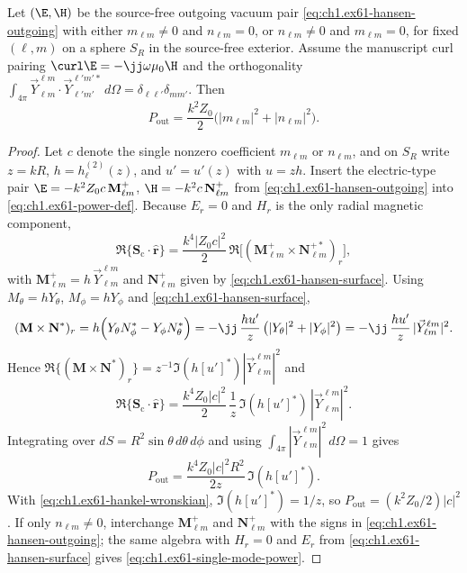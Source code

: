 \begin{proposition}
\label{prop:ch1.single-hansen-power}
Let $(\E,\H)$ be the source-free outgoing vacuum pair \eqref{eq:ch1.ex61-hansen-outgoing} with either $m_{\ell m}\neq0$ and $n_{\ell m}=0$, or $n_{\ell m}\neq0$ and $m_{\ell m}=0$, for fixed $(\ell,m)$ on a sphere $S_R$ in the source-free exterior. Assume the manuscript curl pairing $\curl\E=-\jj\omega\mu_0\H$ and the orthogonality $\int_{4\pi}\vec Y_{\ell m}^{\ell m}\cdot\vec Y_{\ell'm'}^{\ell'm'*}\,d\Omega=\delta_{\ell\ell'}\delta_{mm'}$. Then
\begin{equation}
\label{eq:ch1.ex61-single-mode-power}
P_{\mathrm{out}}=\frac{k^2 Z_0}{2}\bigl(|m_{\ell m}|^2+|n_{\ell m}|^2\bigr).
\end{equation}
\end{proposition}
\begin{proof}
Let $c$ denote the single nonzero coefficient $m_{\ell m}$ or $n_{\ell m}$, and on $S_R$ write $z=kR$, $h=h_\ell^{(2)}(z)$, and $u'=u'(z)$ with $u=zh$. Insert the electric-type pair $\E=-k^2 Z_0 c\,\mathbf M_{\ell m}^+$, $\H=-k^2 c\,\mathbf N_{\ell m}^+$ from \eqref{eq:ch1.ex61-hansen-outgoing} into \eqref{eq:ch1.ex61-power-def}. Because $E_r=0$ and $H_r$ is the only radial magnetic component,
\[
\Re\{\mathbf S_\mathrm{c}\cdot\hat{\mathbf r}\}
=\frac{k^4|Z_0 c|^2}{2}\,\Re\bigl[(\mathbf M_{\ell m}^+\times\mathbf N_{\ell m}^{+*})_r\bigr],
\]
with $\mathbf M_{\ell m}^+=h\,\vec Y_{\ell m}^{\ell m}$ and $\mathbf N_{\ell m}^+$ given by \eqref{eq:ch1.ex61-hansen-surface}. Using $M_\theta=hY_\theta$, $M_\phi=hY_\phi$ and \eqref{eq:ch1.ex61-hansen-surface},
\[
(\mathbf M\times\mathbf N^*)_r
=h\Bigl(Y_\theta N_\phi^*-Y_\phi N_\theta^*\Bigr)
=-\jj\,\frac{h u'}{z}\,\bigl(|Y_\theta|^2+|Y_\phi|^2\bigr)
=-\jj\,\frac{h u'}{z}\,|\vec Y_{\ell m}^{\ell m}|^2.
\]
Hence $\Re\{(\mathbf M\times\mathbf N^*)_r\}=z^{-1}\Im(h[u']^*)|\vec Y_{\ell m}^{\ell m}|^2$ and
\[
\Re\{\mathbf S_\mathrm{c}\cdot\hat{\mathbf r}\}
=\frac{k^4 Z_0 |c|^2}{2}\,\frac{1}{z}\,\Im(h[u']^*)\,|\vec Y_{\ell m}^{\ell m}|^2.
\]
Integrating over $dS=R^2\sin\theta\,d\theta\,d\phi$ and using $\int_{4\pi}|\vec Y_{\ell m}^{\ell m}|^2\,d\Omega=1$ gives
\[
P_{\mathrm{out}}=\frac{k^4 Z_0 |c|^2 R^2}{2z}\,\Im(h[u']^*).
\]
With \eqref{eq:ch1.ex61-hankel-wronskian}, $\Im(h[u']^*)=1/z$, so $P_{\mathrm{out}}=(k^2 Z_0/2)|c|^2$.
If only $n_{\ell m}\neq0$, interchange $\mathbf M_{\ell m}^+$ and $\mathbf N_{\ell m}^+$ with the signs in \eqref{eq:ch1.ex61-hansen-outgoing}; the same algebra with $H_r=0$ and $E_r$ from \eqref{eq:ch1.ex61-hansen-surface} gives \eqref{eq:ch1.ex61-single-mode-power}.
\end{proof}


